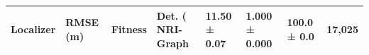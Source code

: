 \begin{tabular}{lllll}
\toprule
Localizer & RMSE (m) & Fitness & Det. (%
\midrule
NRI-Graph & 11.50 ± 0.07 & 1.000 ± 0.000 & 100.0 ± 0.0 & 17,025 \\
\bottomrule
\end{tabular}
